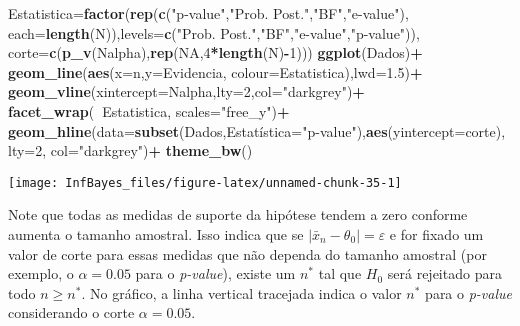 \documentclass[
]{book}
\newenvironment{Shaded}{\begin{snugshade}}{\end{snugshade}}
\newcommand{\DataTypeTok}[1]{\textcolor[rgb]{0.13,0.29,0.53}{#1}}
\newcommand{\DecValTok}[1]{\textcolor[rgb]{0.00,0.00,0.81}{#1}}
\newcommand{\FloatTok}[1]{\textcolor[rgb]{0.00,0.00,0.81}{#1}}
\newcommand{\KeywordTok}[1]{\textcolor[rgb]{0.13,0.29,0.53}{\textbf{#1}}}
\newcommand{\NormalTok}[1]{#1}
\newcommand{\OperatorTok}[1]{\textcolor[rgb]{0.81,0.36,0.00}{\textbf{#1}}}
\newcommand{\OtherTok}[1]{\textcolor[rgb]{0.56,0.35,0.01}{#1}}
\newcommand{\StringTok}[1]{\textcolor[rgb]{0.31,0.60,0.02}{#1}}
\begin{document}
\begin{Shaded}
\begin{Highlighting}[]
       \DataTypeTok{Estatistica=}\KeywordTok{factor}\NormalTok{(}\KeywordTok{rep}\NormalTok{(}\KeywordTok{c}\NormalTok{(}\StringTok{"p-value"}\NormalTok{,}\StringTok{"Prob. Post."}\NormalTok{,}\StringTok{"BF"}\NormalTok{,}\StringTok{"e-value"}\NormalTok{),}
          \DataTypeTok{each=}\KeywordTok{length}\NormalTok{(N)),}\DataTypeTok{levels=}\KeywordTok{c}\NormalTok{(}\StringTok{"Prob. Post."}\NormalTok{,}\StringTok{"BF"}\NormalTok{,}\StringTok{"e-value"}\NormalTok{,}\StringTok{"p-value"}\NormalTok{)),}
       \DataTypeTok{corte=}\KeywordTok{c}\NormalTok{(}\KeywordTok{p_v}\NormalTok{(Nalpha),}\KeywordTok{rep}\NormalTok{(}\OtherTok{NA}\NormalTok{,}\DecValTok{4}\OperatorTok{*}\KeywordTok{length}\NormalTok{(N)}\OperatorTok{-}\DecValTok{1}\NormalTok{)))}
\KeywordTok{ggplot}\NormalTok{(Dados)}\OperatorTok{+}
\StringTok{  }\KeywordTok{geom_line}\NormalTok{(}\KeywordTok{aes}\NormalTok{(}\DataTypeTok{x=}\NormalTok{n,}\DataTypeTok{y=}\NormalTok{Evidencia, }\DataTypeTok{colour=}\NormalTok{Estatistica),}\DataTypeTok{lwd=}\FloatTok{1.5}\NormalTok{)}\OperatorTok{+}
\StringTok{  }\KeywordTok{geom_vline}\NormalTok{(}\DataTypeTok{xintercept=}\NormalTok{Nalpha,}\DataTypeTok{lty=}\DecValTok{2}\NormalTok{,}\DataTypeTok{col=}\StringTok{"darkgrey"}\NormalTok{)}\OperatorTok{+}
\StringTok{  }\KeywordTok{facet_wrap}\NormalTok{(}\OperatorTok{~}\NormalTok{Estatistica, }\DataTypeTok{scales=}\StringTok{"free_y"}\NormalTok{)}\OperatorTok{+}
\StringTok{  }\KeywordTok{geom_hline}\NormalTok{(}\DataTypeTok{data=}\KeywordTok{subset}\NormalTok{(Dados,Estatí}\DataTypeTok{stica=}\StringTok{"p-value"}\NormalTok{),}\KeywordTok{aes}\NormalTok{(}\DataTypeTok{yintercept=}\NormalTok{corte), }\DataTypeTok{lty=}\DecValTok{2}\NormalTok{, }\DataTypeTok{col=}\StringTok{"darkgrey"}\NormalTok{)}\OperatorTok{+}
\StringTok{  }\KeywordTok{theme_bw}\NormalTok{()}
\end{Highlighting}
\end{Shaded}

\begin{center}\texttt{[image: InfBayes\_files/figure-latex/unnamed-chunk-35-1]} \end{center}

Note que todas as medidas de suporte da hipótese tendem a zero conforme aumenta o tamanho amostral. Isso indica que se \(|\bar{x}_n-\theta_0|=\varepsilon\) e for fixado um valor de corte para essas medidas que não dependa do tamanho amostral (por exemplo, o \(\alpha=0.05\) para o \emph{p-value}), existe um \(n^*\) tal que \(H_0\) será rejeitado para todo \(n\geq n^*\). No gráfico, a linha vertical tracejada indica o valor \(n^*\) para o \emph{p-value} considerando o corte \(\alpha=0.05\).
\end{document}
